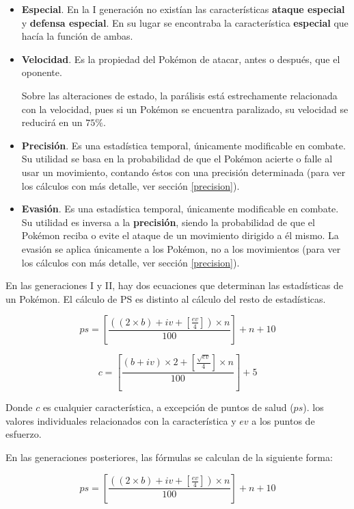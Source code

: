 \documentclass[a4paper, 11pt, titlepage]{article}
\begin{document}
\begin{itemize}
        \item \textbf{Especial}. En la I generación no existían las características \textbf{ataque especial}
        y \textbf{defensa especial}. En su lugar se encontraba la característica \textbf{especial} que hacía 
        la función de ambas.
        
        \item \textbf{Velocidad}. Es la propiedad del Pokémon de atacar, antes o después, que el oponente.
        
        Sobre las alteraciones de estado, la parálisis está estrechamente relacionada con la velocidad, pues 
        si un Pokémon se encuentra paralizado, su velocidad se reducirá en un $75\%$.
        
        \item \textbf{Precisión}. Es una estadística temporal, únicamente modificable en combate. Su 
        utilidad se basa en la probabilidad de que el Pokémon acierte o falle al usar un movimiento, contando 
        éstos con una precisión determinada (para ver los cálculos con más detalle, ver sección \ref{precision}).

        \item \textbf{Evasión}. Es una estadística temporal, únicamente modificable en combate. Su
        utilidad es inversa a la \textbf{precisión}, siendo la probabilidad de que el Pokémon reciba o evite 
        el ataque de un movimiento dirigido a él mismo. La evasión se aplica únicamente a los Pokémon, no a los 
        movimientos (para ver los cálculos con más detalle, ver sección \ref{precision}).
    \end{itemize}

    En las generaciones I y II, hay dos ecuaciones que determinan las estadísticas 
    de un Pokémon. El cálculo de PS es distinto al cálculo del resto de estadísticas.

    \[
        ps = [\frac{((2 \times b) + iv + [\frac{ev}{4}]) \times n}{100}] + n + 10
    \]

    \[
        c = [\frac{(b + iv) \times 2 + [\frac{\sqrt{ev}}{4}] \times n}{100}] + 5    
    \]

    Donde $c$ es cualquier característica, a excepción de puntos de salud ($ps$).
    los valores individuales relacionados con la característica y $ev$ a los puntos 
    de esfuerzo.

    En las generaciones posteriores, las fórmulas se calculan de la siguiente forma:

    \[
        ps = [\frac{((2 \times b) + iv + [\frac{ev}{4}]) \times n}{100}] + n + 10    
    \]
\end{document}
